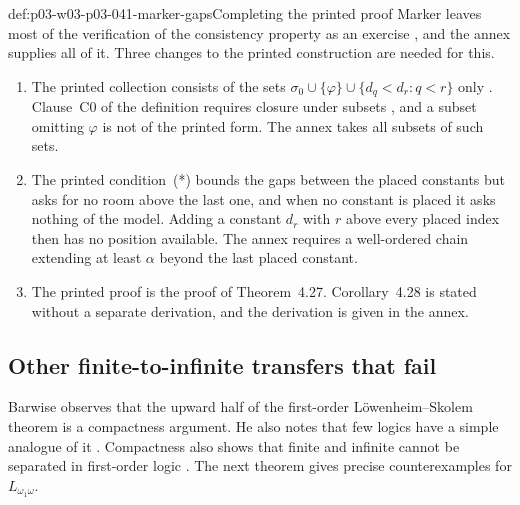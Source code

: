 \begin{hbwarning}{def:p03-w03-p03-041-marker-gaps}{Completing the printed proof}
Marker leaves most of the verification of the consistency property as an
exercise \cite[Exercise~4.29, p.~53]{Marker2014InfinitaryNotes}, and the
annex supplies all of it. Three changes to the printed construction are
needed for this.
\begin{enumerate}
\item The printed collection consists of the sets
      \(\sigma_0\cup\{\varphi\}\cup\{d_q<d_r:q<r\}\) only
      \cite[proof after Corollary~4.28, p.~52]{Marker2014InfinitaryNotes}.
      Clause~C0 of the definition requires closure under subsets
      \cite[Definition~4.1, p.~39]{Marker2014InfinitaryNotes}, and a subset
      omitting \(\varphi\) is not of the printed form. The annex takes all
      subsets of such sets.
\item The printed condition~(*) bounds the gaps between the placed
      constants but asks for no room above the last one, and when no
      constant is placed it asks nothing of the model. Adding a constant
      \(d_r\) with \(r\) above every placed index then has no position
      available. The annex requires a well-ordered chain extending at
      least \(\alpha\) beyond the last placed constant.
\item The printed proof is the proof of Theorem~4.27. Corollary~4.28 is
      stated without a separate derivation, and the derivation is given
      in the annex.
\end{enumerate}
\end{hbwarning}

\subsection{Other finite-to-infinite transfers that fail}
\label{sec:p03-w03-p03-041-transfers}

Barwise observes that the upward half of the first-order
L\"owenheim--Skolem theorem is a compactness argument. He also notes that
few logics have a simple analogue of it
\cite[Ch.~I, \S2.6, p.~19]{Barwise1985BackgroundAims}. Compactness also
shows that finite and infinite cannot be separated in first-order logic
\cite[Ch.~I, \S1.2, p.~6]{Barwise1985BackgroundAims}. The next theorem
gives precise counterexamples for \(L_{\omega_1\omega}\).


